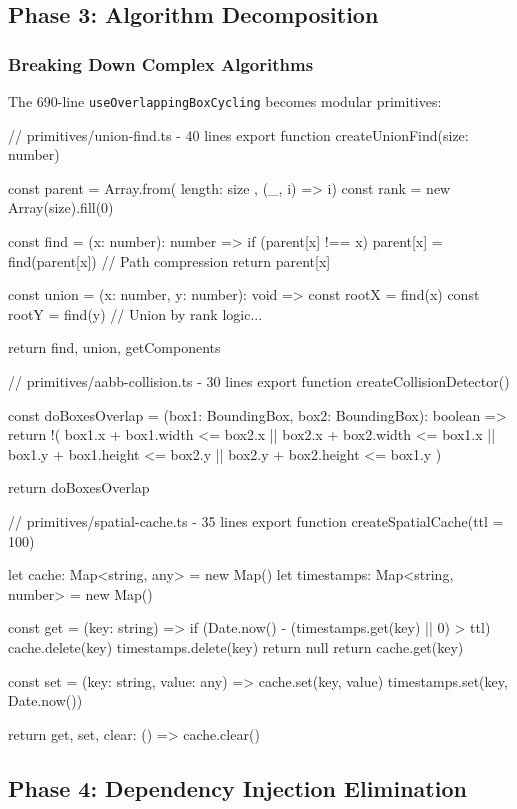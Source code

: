 \documentclass[11pt]{article}
\begin{document}
\subsection{Phase 3: Algorithm Decomposition}

\subsubsection{Breaking Down Complex Algorithms}

The 690-line \texttt{useOverlappingBoxCycling} becomes modular primitives:

\begin{typescriptcode}
// primitives/union-find.ts - 40 lines
export function createUnionFind(size: number) {
  const parent = Array.from({ length: size }, (_, i) => i)
  const rank = new Array(size).fill(0)
  
  const find = (x: number): number => {
    if (parent[x] !== x) {
      parent[x] = find(parent[x]) // Path compression
    }
    return parent[x]
  }
  
  const union = (x: number, y: number): void => {
    const rootX = find(x)
    const rootY = find(y)
    // Union by rank logic...
  }
  
  return { find, union, getComponents }
}

// primitives/aabb-collision.ts - 30 lines
export function createCollisionDetector() {
  const doBoxesOverlap = (box1: BoundingBox, box2: BoundingBox): boolean => {
    return !(
      box1.x + box1.width <= box2.x ||
      box2.x + box2.width <= box1.x ||
      box1.y + box1.height <= box2.y ||
      box2.y + box2.height <= box1.y
    )
  }
  
  return { doBoxesOverlap }
}

// primitives/spatial-cache.ts - 35 lines
export function createSpatialCache(ttl = 100) {
  let cache: Map<string, any> = new Map()
  let timestamps: Map<string, number> = new Map()
  
  const get = (key: string) => {
    if (Date.now() - (timestamps.get(key) || 0) > ttl) {
      cache.delete(key)
      timestamps.delete(key)
      return null
    }
    return cache.get(key)
  }
  
  const set = (key: string, value: any) => {
    cache.set(key, value)
    timestamps.set(key, Date.now())
  }
  
  return { get, set, clear: () => cache.clear() }
}
\end{typescriptcode}

\subsection{Phase 4: Dependency Injection Elimination}
\end{document}
